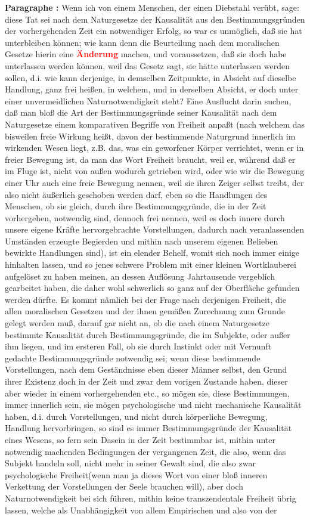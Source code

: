 \documentclass[a4paper,12pt,twoside]{book}
\newcommand{\match}[1]{\textcolor{red}{\textbf{#1}}}
\begin{document}
	\textbf{Paragraphe : }Wenn ich von einem Menschen, der einen Diebstahl verübt, sage: diese Tat sei nach dem Naturgesetze der Kausalität aus den Bestimmungsgründen der vorhergehenden Zeit ein notwendiger Erfolg, so war es unmöglich, daß sie hat unterbleiben können; wie kann denn die Beurteilung nach dem moralischen Gesetze hierin eine \match{Änderung} machen, und voraussetzen, daß sie doch habe unterlassen werden können, weil das Gesetz sagt, sie hätte unterlassen werden sollen, d.i. wie kann derjenige, in demselben Zeitpunkte, in Absicht auf dieselbe Handlung, ganz frei heißen, in welchem, und in  derselben Absicht, er doch unter einer unvermeidlichen Naturnotwendigkeit steht? Eine Ausflucht darin suchen, daß man bloß die Art der Bestimmungsgründe seiner Kausalität nach dem Naturgesetze einem komparativen Begriffe von Freiheit anpaßt (nach welchem das bisweilen freie Wirkung heißt, davon der bestimmende Naturgrund innerlich im wirkenden Wesen liegt, z.B. das, was ein geworfener Körper verrichtet, wenn er in freier Bewegung ist, da man das Wort Freiheit braucht, weil er, während daß er im Fluge ist, nicht von außen wodurch getrieben wird, oder wie wir die Bewegung einer Uhr auch eine freie Bewegung nennen, weil sie ihren Zeiger selbst treibt, der also nicht äußerlich geschoben werden darf, eben so die Handlungen des Menschen, ob sie gleich, durch ihre Bestimmungsgründe, die in der Zeit vorhergehen, notwendig sind, dennoch frei nennen, weil es doch innere durch unsere eigene Kräfte hervorgebrachte Vorstellungen, dadurch nach veranlassenden Umständen erzeugte Begierden und mithin nach unserem eigenen Belieben bewirkte Handlungen sind), ist ein elender Behelf, womit sich noch immer einige hinhalten lassen, und so jenes schwere Problem mit einer kleinen Wortklauberei aufgelöset zu haben meinen, an dessen Auflösung Jahrtausende vergeblich gearbeitet haben, die daher wohl schwerlich so ganz auf der Oberfläche gefunden werden dürfte. Es kommt nämlich bei der Frage nach derjenigen Freiheit, die allen moralischen Gesetzen und der ihnen gemäßen Zurechnung zum Grunde gelegt werden muß, darauf gar nicht an, ob die nach einem Naturgesetze bestimmte Kausalität durch Bestimmungsgründe, die im Subjekte, oder außer ihm liegen, und im ersteren Fall, ob sie durch Instinkt oder mit Vernunft gedachte Bestimmungsgründe notwendig sei; wenn diese bestimmende Vorstellungen, nach dem Geständnisse eben dieser Männer selbst, den Grund ihrer Existenz doch in der Zeit und zwar dem vorigen Zustande haben, dieser aber wieder in einem vorhergehenden etc., so mögen sie, diese Bestimmungen, immer innerlich sein, sie mögen psychologische und nicht mechanische Kausalität haben, d.i. durch Vorstellungen, und nicht durch körperliche Bewegung,  Handlung hervorbringen, so sind es immer Bestimmungsgründe der Kausalität eines Wesens, so fern sein Dasein in der Zeit bestimmbar ist, mithin unter notwendig machenden Bedingungen der vergangenen Zeit, die also, wenn das Subjekt handeln soll, nicht mehr in seiner Gewalt sind, die also zwar psychologische Freiheit(wenn man ja dieses Wort von einer bloß inneren Verkettung der Vorstellungen der Seele brauchen will), aber doch Naturnotwendigkeit bei sich führen, mithin keine transzendentale Freiheit übrig lassen, welche als Unabhängigkeit von allem Empirischen und also von der 
\end{document}
